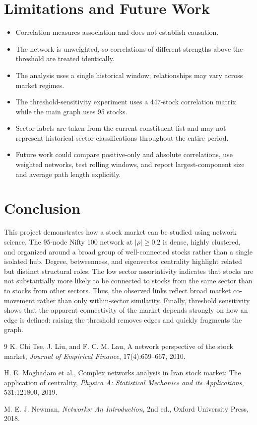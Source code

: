 \documentclass[12pt]{article}
\numberwithin{equation}{section}
\begin{document}
\section{Limitations and Future Work}
\begin{itemize}
  \item Correlation measures association and does not establish causation.
  \item The network is unweighted, so correlations of different strengths
  above the threshold are treated identically.
  \item The analysis uses a single historical window; relationships may vary
  across market regimes.
  \item The threshold-sensitivity experiment uses a 447-stock correlation
  matrix while the main graph uses 95 stocks.
  \item Sector labels are taken from the current constituent list and may not
  represent historical sector classifications throughout the entire period.
  \item Future work could compare positive-only and absolute correlations,
  use weighted networks, test rolling windows, and report largest-component
  size and average path length explicitly.
\end{itemize}

\section{Conclusion}
This project demonstrates how a stock market can be studied using network
science. The 95-node Nifty 100 network at $|\rho|\geq0.2$ is dense, highly
clustered, and organized around a broad group of well-connected stocks rather
than a single isolated hub. Degree, betweenness, and eigenvector centrality
highlight related but distinct structural roles. The low sector assortativity
indicates that stocks are not substantially more likely to be connected to
stocks from the same sector than to stocks from other sectors. Thus, the
observed links reflect broad market co-movement rather than only
within-sector similarity. Finally, threshold
sensitivity shows that the apparent connectivity of the market depends
strongly on how an edge is defined: raising the threshold removes edges and
quickly fragments the graph.

\begin{thebibliography}{9}
K. Chi Tse, J. Liu, and F. C. M. Lau,
\newblock A network perspective of the stock market,
\newblock \emph{Journal of Empirical Finance}, 17(4):659--667, 2010.

H. E. Moghadam et al.,
\newblock Complex networks analysis in Iran stock market: The application of
centrality,
\newblock \emph{Physica A: Statistical Mechanics and its Applications},
531:121800, 2019.

M. E. J. Newman,
\newblock \emph{Networks: An Introduction},
\newblock 2nd ed., Oxford University Press, 2018.
\end{thebibliography}
\end{document}
